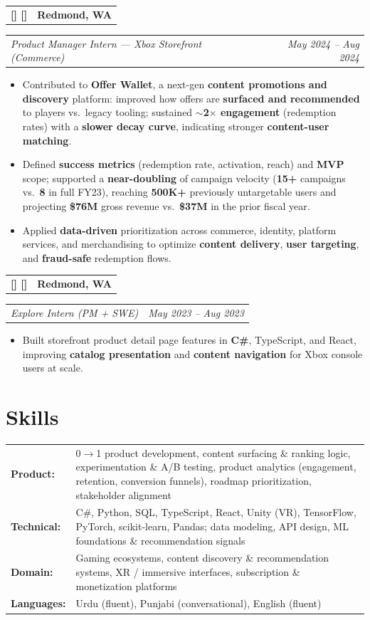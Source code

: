 \documentclass[11pt]{article}
\makeatletter
\newcommand{\FirstBig}[1]{%
  \StrLeft{#1}{1}[\FirstChar]%
  \StrGobbleLeft{#1}{1}[\RestChars]%
  {\large\bfseries\FirstChar}\RestChars%
}
\newcommand{\twocol}[2]{%
  \begin{tabularx}{\linewidth}{@{}X r@{}}
    \textbf{\FirstBig{#1}} & \textbf{#2} \\
  \end{tabularx}
}
\newcommand{\roleline}[2]{%
  \begin{tabularx}{\linewidth}{@{}X r@{}}
    \textit{#1} & \textit{#2} \\
  \end{tabularx}
}
\makeatother
\begin{document}
\twocol{Microsoft --- Xbox}{Redmond, WA}
\roleline{Product Manager Intern --- Xbox Storefront (Commerce)}{May 2024 -- Aug 2024}
\begin{itemize}
  \item Contributed to \textbf{Offer Wallet}, a next-gen \textbf{content promotions and discovery} platform: improved how offers are \textbf{surfaced and recommended} to players vs.\ legacy tooling; sustained \textbf{$\sim$2$\times$ engagement} (redemption rates) with a \textbf{slower decay curve}, indicating stronger \textbf{content-user matching}.
  \item Defined \textbf{success metrics} (redemption rate, activation, reach) and \textbf{MVP} scope; supported a \textbf{near-doubling} of campaign velocity (\textbf{15+} campaigns vs.\ \textbf{8} in full FY23), reaching \textbf{500K+} previously untargetable users and projecting \textbf{\$76M} gross revenue vs.\ \textbf{\$37M} in the prior fiscal year.
  \item Applied \textbf{data-driven} prioritization across commerce, identity, platform services, and merchandising to optimize \textbf{content delivery}, \textbf{user targeting}, and \textbf{fraud-safe} redemption flows.
\end{itemize}

\twocol{Microsoft --- Xbox}{Redmond, WA}
\roleline{Explore Intern (PM + SWE)}{May 2023 -- Aug 2023}
\begin{itemize}
  \item Built storefront product detail page features in \textbf{C\#}, TypeScript, and React, improving \textbf{catalog presentation} and \textbf{content navigation} for Xbox console users at scale.
\end{itemize}

\section{Skills}

\begin{tabularx}{\linewidth}{@{} >{\bfseries}l X @{}}
  Product:       & 0$\to$1 product development, content surfacing \& ranking logic, experimentation \& A/B testing, product analytics (engagement, retention, conversion funnels), roadmap prioritization, stakeholder alignment \\[3pt]
  Technical:     & C\#, Python, SQL, TypeScript, React, Unity (VR), TensorFlow, PyTorch, scikit-learn, Pandas; data modeling, API design, ML foundations \& recommendation signals \\[3pt]
  Domain:        & Gaming ecosystems, content discovery \& recommendation systems, XR / immersive interfaces, subscription \& monetization platforms \\[3pt]
  Languages:     & Urdu (fluent), Punjabi (conversational), English (fluent) \\
\end{tabularx}
\end{document}
